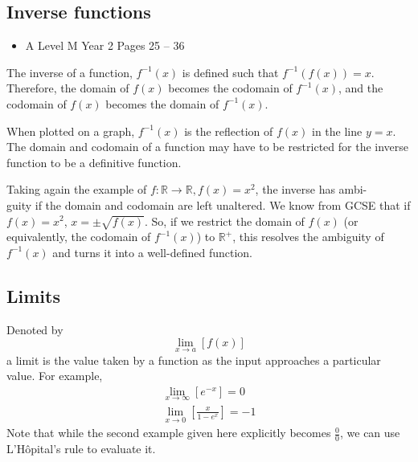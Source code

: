 \documentclass[11pt, a4paper]{article}
\begin{document}
\subsection{Inverse functions}
\label{inversefunctions}
\begin{itemize}
\item A Level M Year 2 \hspace{1cm} \phantom{ AS / } Pages 25 -- 36
\end{itemize}
\par
The inverse of a function, $f^{-1}(x)$ is defined such that $f^{-1}(f(x))=x$. Therefore, the domain of $f(x)$ becomes the codomain of $f^{-1}(x)$, and the codomain of $f(x)$ becomes the domain of $f^{-1}(x)$. \newline \par \vspace{-0.35cm}
When plotted on a graph, $f^{-1}(x)$ is the reflection of $f(x)$ in the line $y=x$. The domain and codomain of a function may have to be restricted for the inverse function to be a definitive function. \newline \par \vspace{-0.35cm}
Taking again the example of $f:\mathbb{R}\rightarrow\mathbb{R}, f(x)=x^{2}$, the inverse has ambi-\\guity if the domain and codomain are left unaltered. We know from GCSE that if $f(x)=x^{2}$, $x=\pm\sqrt{f(x)}$. So, if we restrict the domain of $f(x)$ (or equivalently, the codomain of $f^{-1}(x)$) to $\mathbb{R}^{+}$, this resolves the ambiguity of $f^{-1}(x)$ and turns it into a well-defined function.
\vspace{0.5cm}

\subsection{Limits}
Denoted by
\begin{equation*}
\lim_{x \to a}\left[ f(x)\right]
\end{equation*}
a limit is the value taken by a function as the input approaches a particular value. 
For example,
\begin{gather*}
\lim_{x \to \infty} \left[ e^{-x}\right]=0 \\
\lim_{x \to 0}\left[\frac{x}{1-e^{x}}\right]=-1
\end{gather*}
Note that while the second example given here explicitly becomes $\frac{0}{0}$, we can use L'H\^{o}pital's rule to evaluate it.
\vspace{0.5cm}
\end{document}
